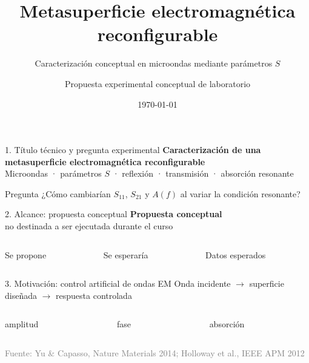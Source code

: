 \documentclass[aspectratio=169]{beamer}
\title{Metasuperficie electromagnética reconfigurable}
\subtitle{Caracterización conceptual en microondas mediante parámetros \(S\)}
\author{Propuesta experimental conceptual de laboratorio}
\date{\today}
\newcommand{\rubrica}[2]{\vspace{0.1cm}{\scriptsize\textcolor{deepblue}{Rúbrica #1 · #2}}}
\newcommand{\fuente}[1]{\vfill{\tiny\textcolor{gray}{Fuente: #1}}}
\begin{document}
\begin{frame}{1. Título técnico y pregunta experimental}
  \centering
  {\Large\bfseries Caracterización de una metasuperficie electromagnética reconfigurable}\\[0.25cm]
  {\large Microondas · parámetros \(S\) · reflexión · transmisión · absorción resonante}

  \vfill
  \begin{block}{Pregunta}
    \centering
    ¿Cómo cambiarían \(S_{11}\), \(S_{21}\) y \(A(f)\) al variar la condición resonante?
  \end{block}
  \rubrica{1}{Título del experimento}
\end{frame}

\begin{frame}{2. Alcance: propuesta conceptual}
  \centering
  {\Huge\textbf{Propuesta conceptual}}\\[0.35cm]
  {\Large no destinada a ser ejecutada durante el curso}

  \vfill
  \begin{columns}[T]
    \begin{column}{0.32\textwidth}
      \centering\Large Se propone
    \end{column}
    \begin{column}{0.32\textwidth}
      \centering\Large Se esperaría
    \end{column}
    \begin{column}{0.32\textwidth}
      \centering\Large Datos esperados
    \end{column}
  \end{columns}
  \rubrica{7}{Resultados esperados, no datos reales}
\end{frame}

\begin{frame}{3. Motivación: control artificial de ondas EM}
  \centering
  {\Huge Onda incidente \(\rightarrow\) superficie diseñada \(\rightarrow\) respuesta controlada}

  \vfill
  \begin{columns}[T]
    \begin{column}{0.32\textwidth}
      \centering\Large amplitud
    \end{column}
    \begin{column}{0.32\textwidth}
      \centering\Large fase
    \end{column}
    \begin{column}{0.32\textwidth}
      \centering\Large absorción
    \end{column}
  \end{columns}
  \fuente{Yu \& Capasso, Nature Materials 2014; Holloway et al., IEEE APM 2012}
  \rubrica{3}{Fundamento teórico}
\end{frame}
\end{document}
